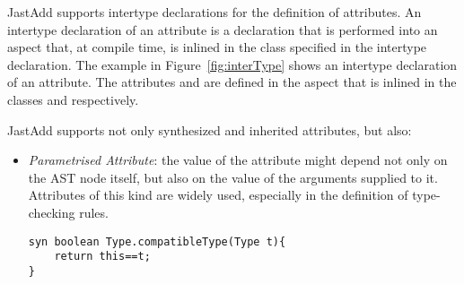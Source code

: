 JastAdd supports intertype declarations for the definition of attributes. An intertype declaration
of an attribute is a declaration that is performed into an aspect that, at compile time,
is inlined in the class specified in the intertype declaration. The example in Figure~\ref{fig:interType}
shows an intertype declaration of an attribute.
The attributes  and  are defined in the aspect 
that is inlined in the classes  and  respectively.

JastAdd supports not only synthesized and inherited attributes, but also:
\begin{itemize}
    \item \emph{Parametrised Attribute}: the value of the attribute might depend
    not only on the AST node itself, but also on the value of the arguments supplied
    to it. Attributes of this kind are widely used, especially in the definition of
    type-checking rules.
    \begin{lstlisting}[language=JastAdd]
syn boolean Type.compatibleType(Type t){
    return this==t;
}
    \end{lstlisting}



\end{itemize}
